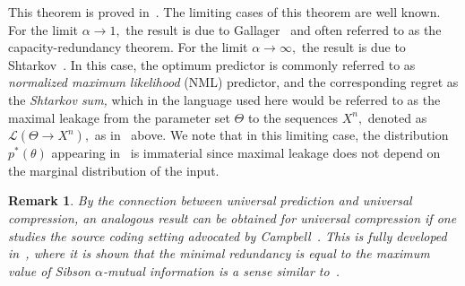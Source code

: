 \documentclass{article}
\numberwithin{theorem}{section}
\numberwithin{example}{section}
\newtheorem{remark}{Remark}
\numberwithin{remark}{section}
\numberwithin{definition}{section}
\newcommand{\ml}[2]{\mathcal{L}\left(#1  \!\!  \to  \!\!   #2\right)} %
\begin{document}
This theorem is proved in~\cite[Theorem 3]{bondaschi2023alphanml}.
The limiting cases of this theorem are well known.
For the limit $\alpha \rightarrow 1,$ the result is due to Gallager~\cite{gallager1} and often referred to as the capacity-redundancy theorem.
For the limit $\alpha\rightarrow\infty,$ the result is due to Shtarkov~\cite{shtarkov1}.
In this case, the optimum predictor is commonly referred to as {\it normalized maximum likelihood} (NML) predictor, and the corresponding regret as the {\it Shtarkov sum,} which in the language used here would be referred to as the maximal leakage from the parameter set $\Theta$ to the sequences $X^n,$ denoted as $\ml{\Theta}{X^n},$ as in~ above.
We note that in this limiting case, the distribution $p^*(\theta)$ appearing in~ is immaterial since maximal leakage does not depend on the marginal distribution of the input.

\begin{remark}
    By the connection between universal prediction and universal compression, an analogous result can be obtained for universal compression if one studies the source coding setting advocated by Campbell~\cite{campbell1}. This is fully developed in~\cite{yagli1}, where it is shown that the minimal redundancy is equal to the maximum value of Sibson $\alpha$-mutual information is a sense similar to~.
\end{remark}





\end{document}
